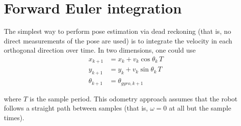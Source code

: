 \section{Forward Euler integration}

The simplest way to perform pose estimation via dead reckoning (that is, no
direct measurements of the pose are used) is to integrate the velocity in each
orthogonal direction over time. In two dimensions, one could use
\begin{align*}
  x_{k+1} &= x_k + v_k\cos\theta_k\,T \\
  y_{k+1} &= y_k + v_k\sin\theta_k\,T \\
  \theta_{k+1} &= \theta_{gyro,k+1}
\end{align*}

where $T$ is the sample period. This odometry approach assumes that the robot
follows a straight path between samples (that is, $\omega = 0$ at all but the
sample times).
